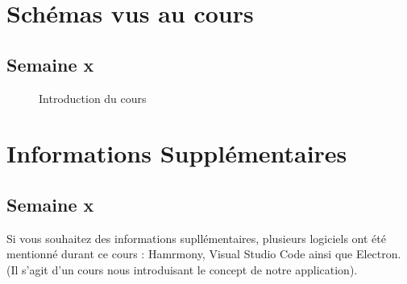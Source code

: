 \documentclass{article}[12pt]
\begin{document}


\tableofcontents%
\newpage
\section{Schémas vus au cours}
\subsection{Semaine x}
\begin{figure}[H]
    \centering
    \caption{Introduction du cours}
\end{figure}

\section{Informations Supplémentaires}
\subsection{Semaine x}
Si vous souhaitez des informations supllémentaires, plusieurs logiciels ont été mentionné durant ce cours : Hamrmony, Visual Studio Code ainsi que Electron. (Il s'agit d'un cours nous introduisant le concept de notre application).
\end{document}
